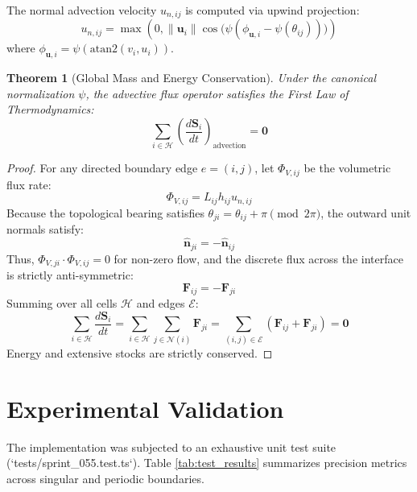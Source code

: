 \documentclass[10pt,journal,compsoc]{IEEEtran}
\newtheorem{theorem}{Theorem}
\begin{document}
The normal advection velocity $u_{n, ij}$ is computed via upwind projection:
\begin{equation}
u_{n, ij} = \max\left(0, \|\mathbf{u}_i\| \cos\big(\psi(\phi_{\mathbf{u}, i} - \psi(\theta_{ij}))\big)\right)
\end{equation}
where $\phi_{\mathbf{u}, i} = \psi(\text{atan2}(v_i, u_i))$.

\begin{theorem}[Global Mass and Energy Conservation]
Under the canonical normalization $\psi$, the advective flux operator satisfies the First Law of Thermodynamics:
\begin{equation}
\sum_{i \in \mathcal{H}} \left( \frac{d\mathbf{S}_i}{dt} \right)_{\text{advection}} = \mathbf{0}
\end{equation}
\end{theorem}

\begin{proof}
For any directed boundary edge $e = (i, j)$, let $\Phi_{V, ij}$ be the volumetric flux rate:
\begin{equation}
\Phi_{V, ij} = L_{ij} h_{ij} u_{n, ij}
\end{equation}
Because the topological bearing satisfies $\theta_{ji} = \theta_{ij} + \pi \pmod{2\pi}$, the outward unit normals satisfy:
\begin{equation}
\hat{\mathbf{n}}_{ji} = -\hat{\mathbf{n}}_{ij}
\end{equation}
Thus, $\Phi_{V, ji} \cdot \Phi_{V, ij} = 0$ for non-zero flow, and the discrete flux across the interface is strictly anti-symmetric:
\begin{equation}
\mathbf{F}_{ij} = -\mathbf{F}_{ji}
\end{equation}
Summing over all cells $\mathcal{H}$ and edges $\mathcal{E}$:
\begin{equation}
\sum_{i \in \mathcal{H}} \frac{d\mathbf{S}_i}{dt} = \sum_{i \in \mathcal{H}} \sum_{j \in \mathcal{N}(i)} \mathbf{F}_{ji} = \sum_{(i,j) \in \mathcal{E}} (\mathbf{F}_{ij} + \mathbf{F}_{ji}) = \mathbf{0}
\end{equation}
Energy and extensive stocks are strictly conserved.
\end{proof}

\section{Experimental Validation}

The implementation was subjected to an exhaustive unit test suite (`tests/sprint_055.test.ts`). Table \ref{tab:test_results} summarizes precision metrics across singular and periodic boundaries.
\end{document}
